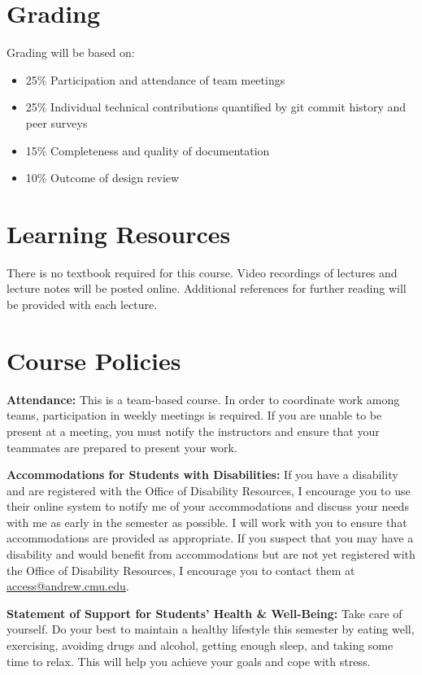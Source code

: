 \documentclass[11pt,letterpaper]{article}
\begin{document}
\section*{Grading}

Grading will be based on:
\begin{itemize}
	\item 25\% Participation and attendance of team meetings
	\item 25\% Individual technical contributions quantified by git commit history and peer surveys
	\item 15\% Completeness and quality of documentation
	\item 10\% Outcome of design review
\end{itemize}


\section*{Learning Resources}

There is no textbook required for this course. Video recordings of lectures and lecture notes will be posted online. Additional references for further reading will be provided with each lecture.

\section*{Course Policies}

\textbf{Attendance:} This is a team-based course. In order to coordinate work among teams, participation in weekly meetings is required. If you are unable to be present at a meeting, you must notify the instructors and ensure that your teammates are prepared to present your work.

\medskip
\noindent
\textbf{Accommodations for Students with Disabilities:} If you have a disability and are registered with the Office of Disability Resources, I encourage you to use their online system to notify me of your accommodations and discuss your needs with me as early in the semester as possible. I will work with you to ensure that accommodations are provided as appropriate. If you suspect that you may have a disability and would benefit from accommodations but are not yet registered with the Office of Disability Resources, I encourage you to contact them at \href{mailto:access@andrew.cmu.edu}{access@andrew.cmu.edu}.

\medskip
\noindent
\textbf{Statement of Support for Students' Health \& Well-Being:} Take care of yourself. Do your best to maintain a healthy lifestyle this semester by eating well, exercising, avoiding drugs and alcohol, getting enough sleep, and taking some time to relax. This will help you achieve your goals and cope with stress.
\end{document}
